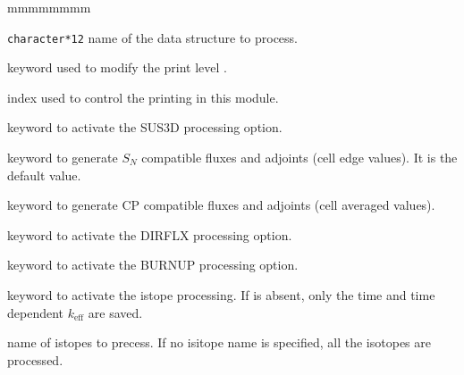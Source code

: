 \begin{ListeDeDescription}{mmmmmmmm}
\item[\dusa{BURNUP}] \verb|character*12| name of the  data structure to process.

\item[\moc{EDIT}] keyword used to modify the print level .

\item[\dusa{iprint}] index used to control the printing in this module. 

\item[\moc{SUS3D}] keyword to activate the SUS3D processing option.

\item[\moc{SN}] keyword to generate $S_N$ compatible fluxes and adjoints (cell edge values). It is the default value.  

\item[\moc{CP}] keyword to generate CP compatible fluxes and adjoints (cell averaged values).

\item[\moc{DIRFLX}] keyword to activate the DIRFLX processing option.

\item[\moc{BURNUP}] keyword to activate the BURNUP processing option.

\item[\moc{ISOP}] keyword to activate the istope processing. If  is absent, only the time and time dependent $k_{\text{eff}}$ are saved.

\item[\moc{NAMISO}] name of istopes to precess. If no isitope name is specified, all the isotopes are processed.

\end{ListeDeDescription}

\eject
